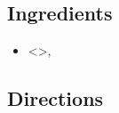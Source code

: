 \section{}

\subsection{ Ingredients }

\begin{itemize}
  \item <>,
\end{itemize}

\subsection{ Directions }

\begin{enumerate}
\end{enumerate}
